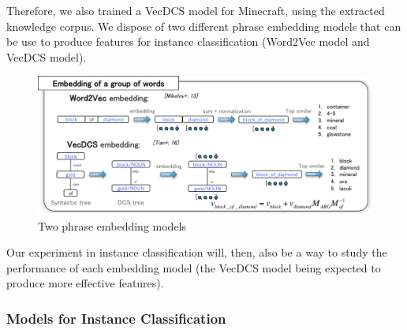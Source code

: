 \documentclass[12pt]{article}
\begin{document}
Therefore, we also trained a VecDCS model for Minecraft, using the extracted knowledge corpus.
We dispose of two different phrase embedding models that can be use to produce features for instance classification (Word2Vec model and VecDCS model).

\begin{figure}[!ht]
   \centering \includegraphics[width=\linewidth]{Figures/Semantic_Parsing/groupWordEmbedding.png}
   \caption{\label{groupWordEmbedding} Two phrase embedding models}
\end{figure}

Our experiment in instance classification will, then, also be a way to study the performance of each embedding model (the VecDCS model being expected to produce more effective features).

\subsubsection{Models for Instance Classification}
\end{document}
